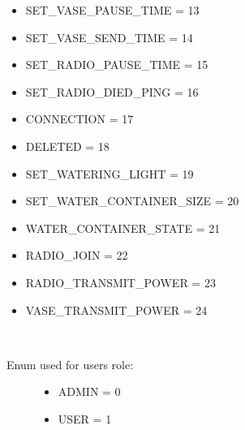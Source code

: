 \documentclass[letterpaper,10pt,english]{sphinxmanual}
\begin{document}
\begin{fulllineitems}
\begin{description}
\begin{itemize}
\item {} 
SET\_VASE\_PAUSE\_TIME = 13

\item {} 
SET\_VASE\_SEND\_TIME = 14

\item {} 
SET\_RADIO\_PAUSE\_TIME = 15

\item {} 
SET\_RADIO\_DIED\_PING = 16

\item {} 
CONNECTION = 17

\item {} 
DELETED = 18

\item {} 
SET\_WATERING\_LIGHT = 19

\item {} 
SET\_WATER\_CONTAINER\_SIZE = 20

\item {} 
WATER\_CONTAINER\_STATE = 21

\item {} 
RADIO\_JOIN = 22

\item {} 
RADIO\_TRANSMIT\_POWER = 23

\item {} 
VASE\_TRANSMIT\_POWER = 24

\end{itemize}

\end{description}

\end{fulllineitems}


\begin{fulllineitems}
\label{\detokenize{index:model.constant.Role}}~\begin{description}
\item[{Enum used for users role:}] \leavevmode\begin{itemize}
\item {} 
ADMIN = 0

\item {} 
USER = 1

\end{itemize}

\end{description}

\end{fulllineitems}
\end{document}
